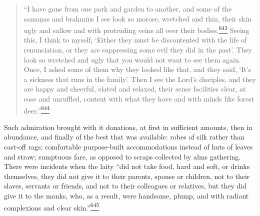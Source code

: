 \begin{quote}
``I have gone from one park and garden to another, and some of the
samaṇas and brahmins I see look so morose, wretched and thin, their skin
ugly and sallow and with protruding veins all over their
bodies.\label{footprints_split_016.html_fnref643}\hyperref[footprints_split_025.htmlux5cux23fn643]{\textsuperscript{643}}
Seeing this, I think to myself, `Either they must be discontented with
the life of renunciation, or they are suppressing some evil they did in
the past'. They look so wretched and ugly that you would not want to see
them again. Once, I asked some of them why they looked like that, and
they said, `It's a sickness that runs in the family'. Then I see the
Lord's disciples, and they are happy and cheerful, elated and relaxed,
their sense facilities clear, at ease and unruffled, content with what
they have and with minds like forest
deer.''\label{footprints_split_016.html_fnref644}\hyperref[footprints_split_025.htmlux5cux23fn644]{\textsuperscript{644}}
\end{quote}

Such admiration brought with it donations, at first in sufficient
amounts, then in abundance, and finally of the best that was available:
robes of silk rather than cast-off rags; comfortable purpose-built
accommodations instead of huts of leaves and straw; sumptuous fare, as
opposed to scraps collected by alms gathering. There were incidents when
the laity ``did not take food, hard and soft, or drinks themselves, they
did not give it to their parents, spouse or children, not to their
slaves, servants or friends, and not to their colleagues or relatives,
but they did give it to the monks, who, as a result, were handsome,
plump, and with radiant complexions and clear
skin.''\label{footprints_split_016.html_fnref645}\hyperref[footprints_split_025.htmlux5cux23fn645]{\textsuperscript{645}}

